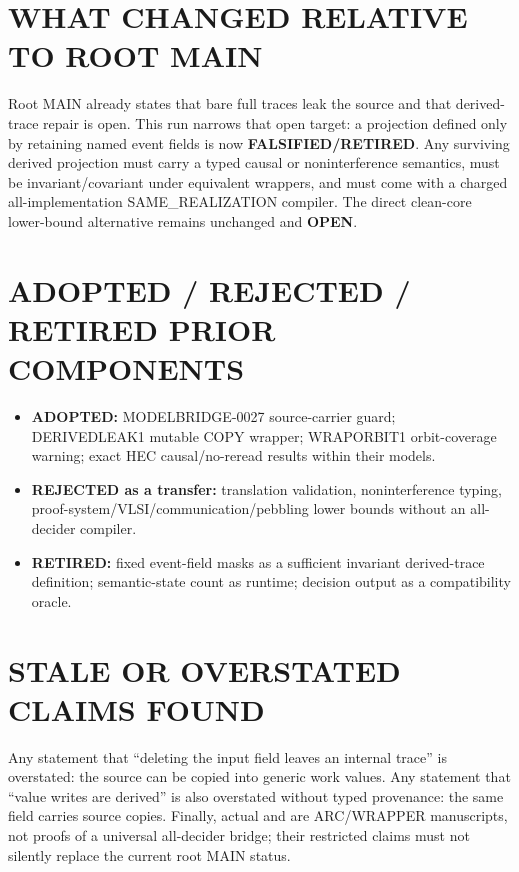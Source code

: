 \documentclass[11pt]{article}
\newcommand{\OPEN}{\textbf{OPEN}}
\newcommand{\RETIRED}{\textbf{FALSIFIED/RETIRED}}
\begin{document}
\section{WHAT CHANGED RELATIVE TO ROOT MAIN}

Root MAIN already states that bare full traces leak the source and that
derived-trace repair is open.  This run narrows that open target: a projection
defined only by retaining named event fields is now \RETIRED.  Any surviving
derived projection must carry a typed causal or noninterference semantics,
must be invariant/covariant under equivalent wrappers, and must come with a
charged all-implementation SAME\_REALIZATION compiler.  The direct clean-core
lower-bound alternative remains unchanged and \OPEN.

\section{ADOPTED / REJECTED / RETIRED PRIOR COMPONENTS}

\begin{itemize}[leftmargin=*]
\item \textbf{ADOPTED:} MODELBRIDGE-0027 source-carrier guard;
DERIVEDLEAK1 mutable COPY wrapper; WRAPORBIT1 orbit-coverage warning; exact
HEC causal/no-reread results within their models.
\item \textbf{REJECTED as a transfer:} translation validation,
noninterference typing, proof-system/VLSI/communication/pebbling lower bounds
without an all-decider compiler.
\item \textbf{RETIRED:} fixed event-field masks as a sufficient invariant
derived-trace definition; semantic-state count as runtime; decision output as
a compatibility oracle.
\end{itemize}

\section{STALE OR OVERSTATED CLAIMS FOUND}

Any statement that ``deleting the input field leaves an internal trace'' is
overstated: the source can be copied into generic work values.  Any statement
that ``value writes are derived'' is also overstated without typed provenance:
the same field carries source copies.  Finally, actual  and
 are ARC/WRAPPER manuscripts, not proofs of a universal
all-decider bridge; their restricted claims must not silently replace the
current root MAIN status.
\end{document}
